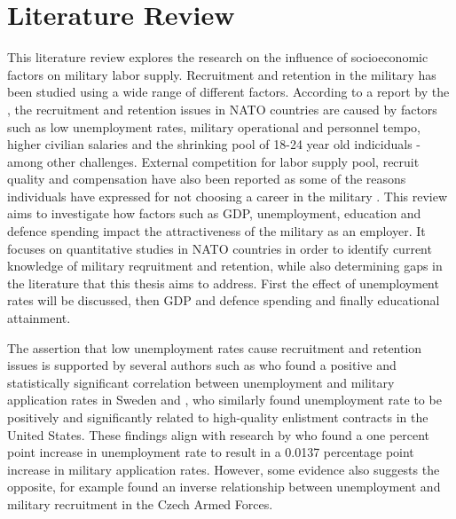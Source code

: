 \chapter{Literature Review}

This literature review explores the research on the influence of socioeconomic 
factors on military labor supply. 
Recruitment and retention in the military has been studied using a wide range of
different factors. According to a report by the \textcite{nato_research_and_technology_organization_recruiting_2007}, 
the recruitment and retention issues in NATO countries are 
caused by factors such as low unemployment rates, military operational and personnel tempo,
higher civilian salaries and the shrinking pool of 18-24 year old indiciduals - among 
other challenges. External
competition for labor supply pool, recruit quality and compensation have also been 
reported as some of the reasons
individuals have expressed for not choosing a career in the military \parencite{nato_research_and_technology_organization_recruiting_2007}.
This review aims to investigate how 
factors such as GDP, unemployment, education and defence spending impact the 
attractiveness of the military as an employer. It focuses 
on quantitative studies in NATO countries in order to identify 
current knowledge of military reqruitment and retention, while also determining 
gaps in the literature that this thesis aims to address. 
First the effect of unemployment rates will be discussed, then GDP and defence spending 
and finally educational attainment.

The assertion that low unemployment rates 
cause recruitment and retention issues is supported by several authors such as 
\textcite{backstrom_are_2019} who found a positive and statistically significant correlation 
between unemployment and military application rates in Sweden and \textcite{asch_cash_2010},
who similarly found unemployment rate to be positively and significantly related to
high-quality enlistment contracts in the United States. These findings align with 
research by \textcite{balcaen_unemployment_2025} who found a one percent point increase in 
unemployment rate to result in a 0.0137 percentage point increase in military 
application rates. However, some evidence also suggests the opposite, for example 
\textcite{holcner_military_2021} found an inverse relationship between unemployment and military 
recruitment in the Czech Armed Forces.

